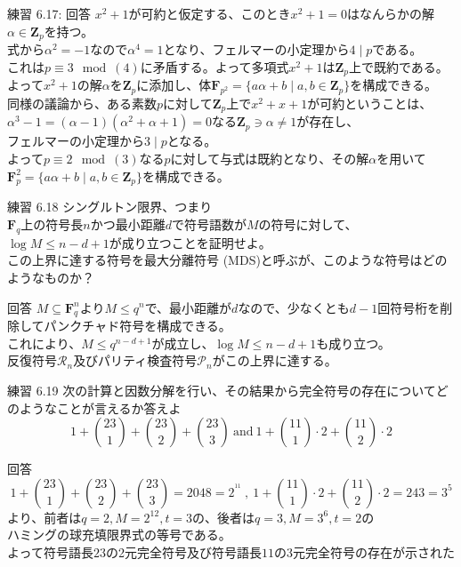 \documentclass[dvipdfmx,10pt,jsarticle]{beamer}
\begin{document}
  \begin{frame}{練習 6.17: 回答}
    $x^2 + 1$が可約と仮定する、このとき$x^2+ 1 = 0$はなんらかの解$\alpha \in \mathbf{Z}_p$を持つ。\\
    式から$\alpha^2 = -1 $なので$\alpha^4 = 1$となり、フェルマーの小定理から$4 \mid p$である。\\
    これは$p \equiv 3 \mod (4)$に矛盾する。よって多項式$x^2 + 1$は$\mathbf{Z}_p$上で既約である。 \\
    よって$x^2 + 1$の解$\alpha$を$\mathbf{Z}_p$に添加し、体$\mathbf{F}_{p^2} = \lbrace a \alpha + b \mid a, b \in \mathbf{Z}_p \rbrace$を構成できる。 \\
    同様の議論から、ある素数$p$に対して$\mathbf{Z}_p$上で$x^2 + x + 1$が可約ということは、$\alpha^3 - 1 = (\alpha - 1)(\alpha^2 + \alpha + 1) = 0$なる$\mathbf{Z}_p \ni \alpha \neq 1$が存在し、\\
    フェルマーの小定理から$3 \mid p$となる。\\
    よって$p \equiv 2 \mod (3)$なる$p$に対して与式は既約となり、その解$\alpha$を用いて$\mathbf{F}_p^2 = \lbrace a \alpha + b \mid a, b \in \mathbf{Z}_p \rbrace$を構成できる。
  \end{frame}

  \begin{frame}{練習 6.18}
    シングルトン限界、つまり\\
    $\mathbf{F}_q$上の符号長$n$かつ最小距離$d$で符号語数が$M$の符号に対して、$\log M \leq n - d + 1$が成り立つことを証明せよ。\\
    この上界に達する符号を最大分離符号 (MDS)と呼ぶが、このような符号はどのようなものか？
    \begin{block}{回答}
      $M \subseteq \mathbf{F}_q^n$より$M \leq q^n$で、最小距離が$d$なので、少なくとも$d - 1$回符号桁を削除してパンクチャド符号を構成できる。\\
      これにより、$M \leq q^{n - d + 1}$が成立し、$\log M \leq n - d + 1$も成り立つ。 \\
      反復符号$\mathcal{R}_n$及びパリティ検査符号$\mathcal{P}_n$がこの上界に達する。
    \end{block}
  \end{frame}

  \begin{frame}{練習 6.19}
    次の計算と因数分解を行い、その結果から完全符号の存在についてどのようなことが言えるか答えよ
    \[ 1 + \binom{23}{1} + \binom{23}{2} + \binom{23}{3} \  \text{and} \  1 + \binom{11}{1}\cdot 2 + \binom{11}{2} \cdot 2\]
    \begin{block}{回答}
      \[1 + \binom{23}{1} + \binom{23}{2} + \binom{23}{3} = 2048 = 2^{^{11}} \ , \ 1 + \binom{11}{1}\cdot 2 + \binom{11}{2} \cdot 2 = 243 =  3^5\]
      より、前者は$q = 2, M = 2^{12}, t = 3$の、後者は$q = 3, M = 3^6, t = 2$の\\ハミングの球充填限界式の等号である。\\
      よって符号語長$23$の2元完全符号及び符号語長$11$の3元完全符号の存在が示された
    \end{block}
  \end{frame}
\end{document}
